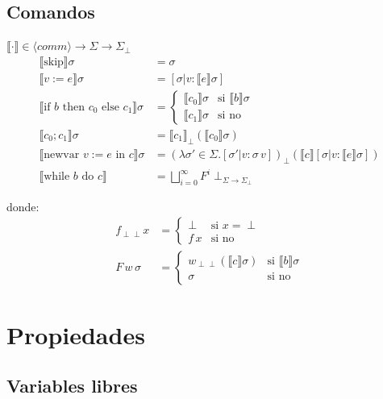 \documentclass[a4paper,11pt]{article}
\begin{document}
\subsection*{Comandos}
$\llbracket \cdot \rrbracket \in \langle comm \rangle \rightarrow \Sigma \rightarrow \Sigma_\perp$
\begin{align*}
    \llbracket \text{skip} \rrbracket \sigma &= \sigma \\
    \llbracket v := e \rrbracket \sigma &= [\sigma | v : \llbracket e \rrbracket \sigma] \\
    \llbracket \text{if } b \text{ then } c_0 \text{ else } c_1 \rrbracket \sigma &= 
    \begin{cases} 
        \llbracket c_0 \rrbracket \sigma & \text{si } \llbracket b \rrbracket \sigma \\ 
        \llbracket c_1 \rrbracket \sigma & \text{si no} 
    \end{cases} \\
    \llbracket c_0; c_1 \rrbracket \sigma &= \llbracket c_1 \rrbracket_\perp (\llbracket c_0 \rrbracket \sigma) \\
    \llbracket \text{newvar } v := e \text{ in } c \rrbracket \sigma &= (\lambda \sigma' \in \Sigma. [\sigma' | v : \sigma \, v])_\perp (\llbracket c \rrbracket [\sigma | v : \llbracket e \rrbracket \sigma]) \\
    \llbracket \text{while } b \text{ do } c \rrbracket &= \bigsqcup_{i=0}^{\infty} F^i \perp_{\Sigma \rightarrow \Sigma_\perp}
\end{align*}

\noindent donde:
\begin{align*}
    f_{\perp\perp} x &= \begin{cases} \perp & \text{si } x = \perp \\ f \, x & \text{si no} \end{cases} \\
    F \, w \, \sigma &= \begin{cases} w_{\perp\perp} (\llbracket c \rrbracket \sigma) & \text{si } \llbracket b \rrbracket \sigma \\ \sigma & \text{si no} \end{cases}
\end{align*}

\section{Propiedades}

\subsection{Variables libres}
\end{document}
